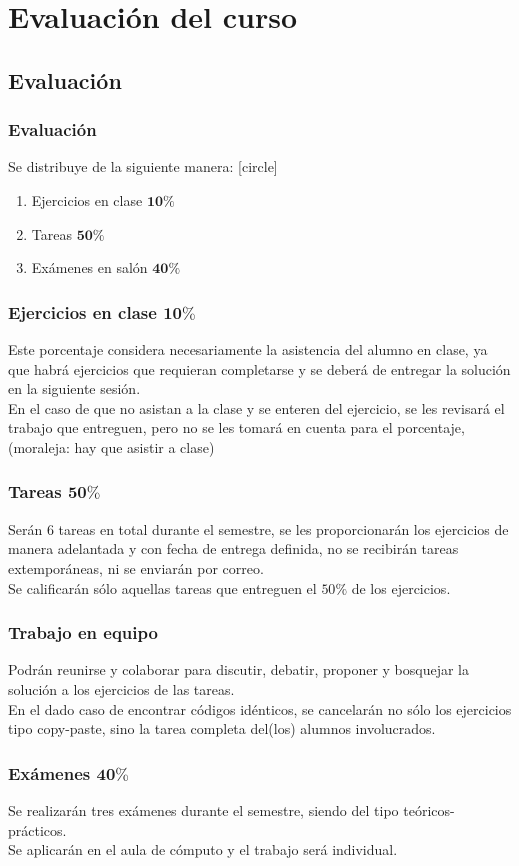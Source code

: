 \section{Evaluación del curso}
\subsection{Evaluación}
\begin{frame}
\frametitle{Evaluación}
Se distribuye de la siguiente manera:
[circle]
\begin{enumerate}[<+->]
\item Ejercicios en clase $\mathbf{10\%}$
\item Tareas $\mathbf{50\%}$
\item Exámenes en salón $\mathbf{40\%}$
\end{enumerate}
\end{frame}
\begin{frame}
\frametitle{Ejercicios en clase $\mathbf{10\%}$}
Este porcentaje considera necesariamente la asistencia del alumno en clase, ya que habrá ejercicios que requieran completarse y se deberá de entregar la solución en la siguiente sesión.
\\
\medskip
En el caso de que no asistan a la clase y se enteren del ejercicio, se les revisará el trabajo que entreguen, pero no se les tomará en cuenta para el porcentaje, (moraleja: hay que asistir a clase) 
\end{frame}
\begin{frame}
\frametitle{Tareas $\mathbf{50\%}$}
Serán 6 tareas en total durante el semestre, se les proporcionarán los ejercicios de manera adelantada y con fecha de entrega definida, no se recibirán tareas extemporáneas, ni se enviarán por correo.
\\
\bigskip
Se calificarán sólo aquellas tareas que entreguen el $50\%$ de los ejercicios. 
\end{frame}
\begin{frame}
\frametitle{Trabajo en equipo}
Podrán reunirse y colaborar para discutir, debatir, proponer y bosquejar la solución a los ejercicios de las tareas.
\\
\bigskip
En el dado caso de encontrar códigos idénticos, se cancelarán no sólo los ejercicios tipo copy-paste, sino la tarea completa del(los) alumnos involucrados.
\end{frame}
\begin{frame}
\frametitle{Exámenes $\mathbf{40\%}$}
Se realizarán tres exámenes durante el semestre, siendo del tipo teóricos-prácticos.
\\
\bigskip
Se aplicarán en el aula de cómputo y el trabajo será individual.
\end{frame}
